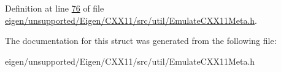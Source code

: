 Definition at line \hyperlink{eigen_2unsupported_2_eigen_2_c_x_x11_2src_2util_2_emulate_c_x_x11_meta_8h_source_l00076}{76} of file \hyperlink{eigen_2unsupported_2_eigen_2_c_x_x11_2src_2util_2_emulate_c_x_x11_meta_8h_source}{eigen/unsupported/\+Eigen/\+C\+X\+X11/src/util/\+Emulate\+C\+X\+X11\+Meta.\+h}.



The documentation for this struct was generated from the following file\+:\begin{DoxyCompactItemize}
\item 
eigen/unsupported/\+Eigen/\+C\+X\+X11/src/util/\+Emulate\+C\+X\+X11\+Meta.\+h\end{DoxyCompactItemize}

